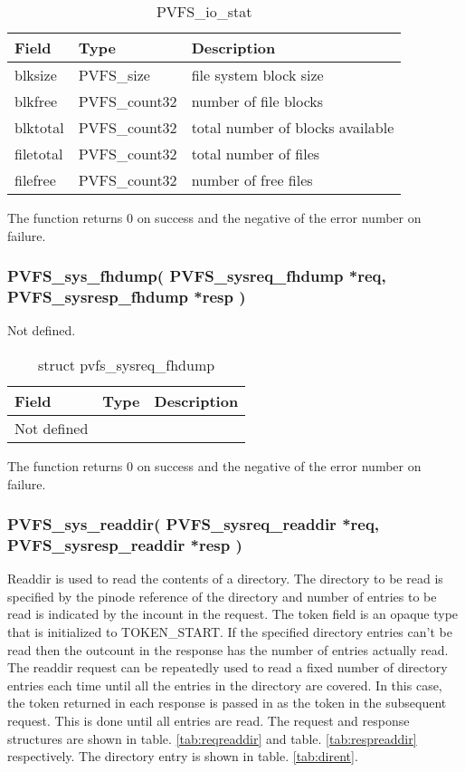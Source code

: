 \documentclass[11pt, letterpaper]{article}
\begin{document}
\begin{table}[H]
\begin{tabular}{|l|l|l|}
\hline
Field & Type & Description \\
\hline
\hline
blksize & PVFS\_size & file system block size \\
\hline
blkfree & PVFS\_count32 & number of file blocks \\
\hline
blktotal & PVFS\_count32 & total number of blocks available \\
\hline 
filetotal & PVFS\_count32 & total number of files \\
\hline 
filefree & PVFS\_count32 & number of free files \\
\hline
\end{tabular}
\caption{PVFS\_io\_stat}\label{tab:iostat}
\end{table}

The function returns 0 on success and the negative of the error
number on failure.

\subsubsection{PVFS\_sys\_fhdump(
PVFS\_sysreq\_fhdump *req,
PVFS\_sysresp\_fhdump *resp
)}

Not defined.

\begin{table}[H]
\begin{tabular}{|l|l|l|}
\hline
Field & Type & Description \\
\hline
\hline
Not defined & & \\
\hline
\end{tabular}
\caption{struct pvfs\_sysreq\_fhdump}\label{tab:reqfhdump}
\end{table}

The function returns 0 on success and the negative of the error
number on failure.

\subsubsection{PVFS\_sys\_readdir(
PVFS\_sysreq\_readdir *req,
PVFS\_sysresp\_readdir *resp
)}

Readdir is used to read the contents of a directory. The directory
to be read is specified by the pinode reference of the directory
and number of entries to be read is indicated by the incount in the
request. The token field is an opaque type that is initialized to
TOKEN\_START. If the specified directory entries can't be read then
the outcount in the response has the number of entries actually read.
The readdir request can be repeatedly used to read a fixed number of
directory entries each time until all the entries in the directory
are covered. In this case, the token returned in each response is
passed in as the token in the subsequent request. This is done until
all entries are read. The request and response structures are shown 
in table. \ref{tab:reqreaddir} and table. \ref{tab:respreaddir} 
respectively. The directory entry is shown in table. \ref{tab:dirent}.
\end{document}
